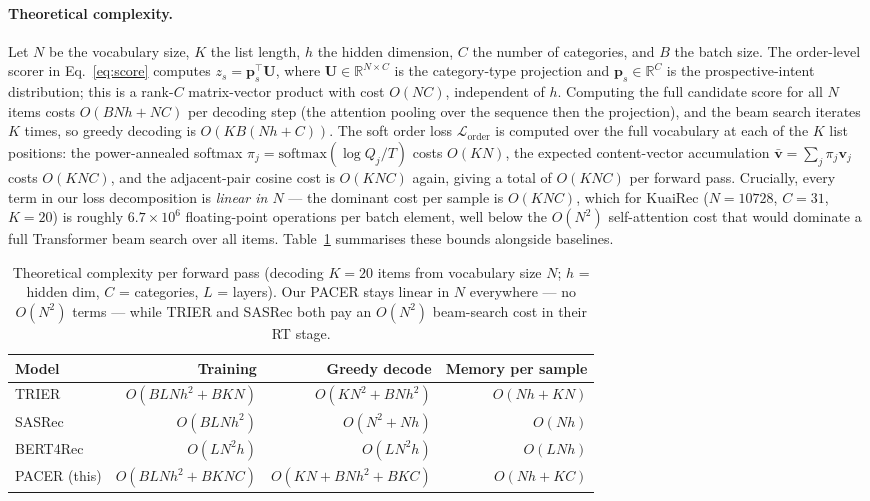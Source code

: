 \paragraph{Theoretical complexity.}
Let $N$ be the vocabulary size, $K$ the list length, $h$ the hidden
dimension, $C$ the number of categories, and $B$ the batch size. The
order-level scorer in Eq.~\eqref{eq:score} computes
$z_s = \mathbf{p}_s^\top \mathbf{U}$, where $\mathbf{U}\in\mathbb{R}^{N\times C}$
is the category-type projection and $\mathbf{p}_s\in\mathbb{R}^{C}$ is the
prospective-intent distribution; this is a rank-$C$ matrix-vector product
with cost $O(NC)$, independent of $h$. Computing the full candidate score
for all $N$ items costs $O(BNh + NC)$ per decoding step (the attention
pooling over the sequence then the projection), and the beam search iterates
$K$ times, so greedy decoding is $O(KB(Nh + C))$. The soft order loss
$\mathcal{L}_{\text{order}}$ is computed over the full vocabulary at each of
the $K$ list positions: the power-annealed softmax $\pi_j = \text{softmax}(\log Q_j / T)$
costs $O(KN)$, the expected content-vector accumulation
$\bar{\mathbf{v}} = \sum_j \pi_j \mathbf{v}_j$ costs $O(KNC)$, and the adjacent-pair
cosine cost is $O(KNC)$ again, giving a total of $O(KNC)$ per forward pass.
Crucially, every term in our loss decomposition is \emph{linear in $N$} --- the
dominant cost per sample is $O(KNC)$, which for KuaiRec ($N=10728$, $C=31$,
$K=20$) is roughly $6.7\times 10^6$ floating-point operations per batch element,
well below the $O(N^2)$ self-attention cost that would dominate a full
Transformer beam search over all items. Table~\ref{tab:complexity} summarises
these bounds alongside baselines.

\begin{table}[t]
\centering
\small
\caption{Theoretical complexity per forward pass (decoding $K=20$ items from
vocabulary size $N$; $h$ = hidden dim, $C$ = categories, $L$ = layers).
Our PACER stays linear in $N$ everywhere --- no $O(N^2)$ terms --- while
TRIER and SASRec both pay an $O(N^2)$ beam-search cost in their RT stage.}
\label{tab:complexity}
\begin{tabular}{lrrr}
\toprule
Model           & Training          & Greedy decode          & Memory per sample \\
\midrule
TRIER           & $O(BLNh^2 + BKN)$ & $O(KN^2 + BNh^2)$ & $O(Nh + KN)$ \\
SASRec          & $O(BLNh^2)$       & $O(N^2 + Nh)$      & $O(Nh)$     \\
BERT4Rec        & $O(LN^2 h)$       & $O(LN^2 h)$        & $O(LNh)$    \\
\midrule
PACER (this)     & $O(BLNh^2 + BKN C)$ & $O(KN + BNh^2 + BKC)$ & $O(Nh + KC)$ \\
\bottomrule
\end{tabular}
\end{table}

